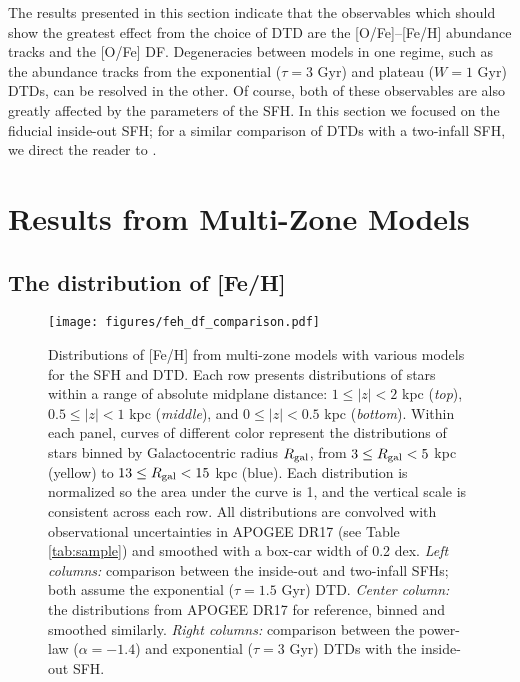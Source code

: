 \documentclass[twocolumn,twocolappendix,linenumbers,trackchanges]{aastex631}
\begin{document}
The results presented in this section indicate that the observables which should show the greatest effect from the choice of DTD are the [O/Fe]--[Fe/H] abundance tracks and the [O/Fe] DF. Degeneracies between models in one regime, such as the abundance tracks from the exponential ($\tau=3$ Gyr) and plateau ($W=1$ Gyr) DTDs, can be resolved in the other. Of course, both of these observables are also greatly affected by the parameters of the SFH. In this section we focused on the fiducial inside-out SFH; for a similar comparison of DTDs with a two-infall SFH, we direct the reader to \citet{Palicio2023-AnalyticDTD}.

\section{Results from Multi-Zone Models}
\label{sec:multizone-results}

\subsection{The distribution of [Fe/H]}
\label{sec:feh-df}

\begin{figure*}
    \centering
    \texttt{[image: figures/feh\_df\_comparison.pdf]}
    \caption{Distributions of [Fe/H] from multi-zone models with various models for the SFH and DTD. Each row presents distributions of stars within a range of absolute midplane distance: $1\leq|z|<2$ kpc (\textit{top}), $0.5\leq|z|<1$ kpc (\textit{middle}), and $0\leq|z|<0.5$ kpc (\textit{bottom}). Within each panel, curves of different color represent the distributions of stars binned by Galactocentric radius $R_{\rm gal}$, from $3\leq R_{\rm gal}<5$ kpc (yellow) to $13\leq R_{\rm gal}<15$ kpc (blue). Each distribution is normalized so the area under the curve is 1, and the vertical scale is consistent across each row. All distributions are convolved with observational uncertainties in APOGEE DR17 (see Table \ref{tab:sample}) and smoothed with a box-car width of 0.2 dex. 
    \textit{Left columns:} comparison between the inside-out and two-infall SFHs; both assume the exponential ($\tau=1.5$ Gyr) DTD. 
    \textit{Center column:} the distributions from APOGEE DR17 for reference, binned and smoothed similarly.
    \textit{Right columns:} comparison between the power-law ($\alpha=-1.4$) and exponential ($\tau=3$ Gyr) DTDs with the inside-out SFH.}
    \label{fig:feh-df-comparison}
\end{figure*}
\end{document}
